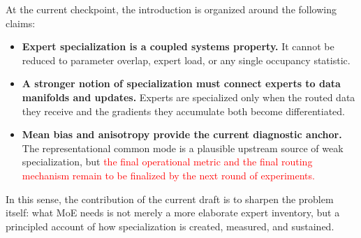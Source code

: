 At the current checkpoint, the introduction is organized around the following claims:
\begin{itemize}
    \item \textbf{Expert specialization is a coupled systems property.} It cannot be reduced to parameter overlap, expert load, or any single occupancy statistic.
    \item \textbf{A stronger notion of specialization must connect experts to data manifolds and updates.} Experts are specialized only when the routed data they receive and the gradients they accumulate both become differentiated.
    \item \textbf{Mean bias and anisotropy provide the current diagnostic anchor.} The representational common mode is a plausible upstream source of weak specialization, but \textcolor{red}{the final operational metric and the final routing mechanism remain to be finalized by the next round of experiments.}
\end{itemize}

In this sense, the contribution of the current draft is to sharpen the problem itself: what MoE needs is not merely a more elaborate expert inventory, but a principled account of how specialization is created, measured, and sustained.
